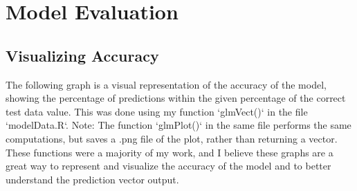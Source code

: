 \documentclass{article}\usepackage[]{graphicx}\usepackage[]{color}
\begin{document}
\section{Model Evaluation}
\subsection{Visualizing Accuracy}
The following graph is a visual representation of the accuracy of the model, showing the percentage of predictions within the given percentage of the correct test data value. This was done using my function `glmVect()` in the file `modelData.R`. Note: The function `glmPlot()` in the same file performs the same computations, but saves a .png file of the plot, rather than returning a vector.
These functions were a majority of my work, and I believe these graphs are a great way to represent and visualize the accuracy of the model and to better understand the prediction vector output.
\end{document}
